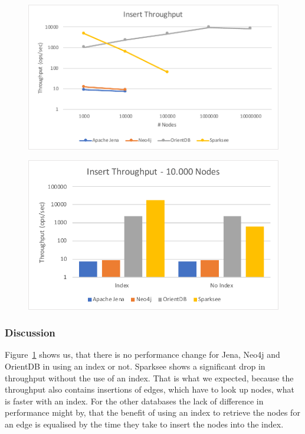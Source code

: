 \begin{figure}[h!]
  \begin{minipage}{.5\textwidth}
    \centering
    \includegraphics[width=\textwidth]{images/throughput/withoutIndexThroughput}
    \label{fig:withoutIndexThroughput}
  \end{minipage}
  \begin{minipage}{.5\textwidth}
    \centering
    \includegraphics[width=\textwidth]{images/throughput/withWithoutIndexThroughputFixNodes}
    \label{fig:withWithoutIndexThroughputFixNodes}
  \end{minipage}
\end{figure}

\subsubsection{Discussion}
Figure~\ref{fig:withWithoutIndexThroughputFixNodes} shows us,
that there is no performance change for Jena, Neo4j and OrientDB in using an index or not.
Sparksee shows a significant drop in throughput without the use of an index.
That is what we expected,
because the throughput also contains insertions of edges,
which have to look up nodes,
what is faster with an index.
For the other databases the lack of difference in performance might by,
that the benefit of using an index to retrieve the nodes for an edge is equalised by the time they take to insert the nodes into the index.

